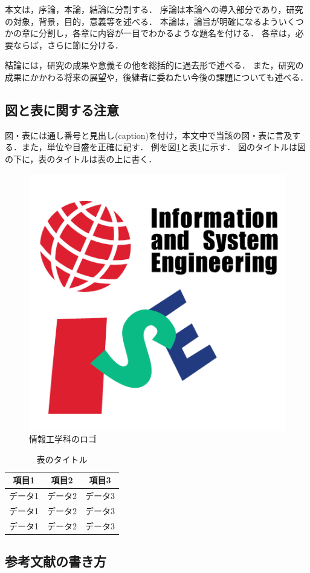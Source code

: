 \documentclass[10pt,a4paper,notitlepage,oneside,twocolumn]{abst_ltjsarticle}
\begin{document}
本文は，序論，本論，結論に分割する．
序論は本論への導入部分であり，研究の対象，背景，目的，意義等を述べる．
本論は，論旨が明確になるよういくつかの章に分割し，各章に内容が一目でわかるような題名を付ける．
各章は，必要ならば，さらに節に分ける．


結論には，研究の成果や意義その他を総括的に過去形で述べる．
また，研究の成果にかかわる将来の展望や，後継者に委ねたい今後の課題についても述べる．

\subsection{図と表に関する注意} \label{subsec:section22}

図・表には通し番号と見出し(caption)を付け，本文中で当該の図・表に言及する．また，単位や目盛を正確に記す．
例を図\ref{fig:logo}と表\ref{tab:}に示す．
図のタイトルは図の下に，表のタイトルは表の上に書く．


\begin{figure}[t]
    \centering
    \includegraphics[width=0.52\linewidth]{logo_color.png}
    \caption{情報工学科のロゴ}
    \label{fig:logo}
  \end{figure}

\begin {table}[t]
    \centering
  \caption{表のタイトル}
  \label{tab:}
  \begin {tabular}{ccc} \hline
     項目1 & 項目2 & 項目3 \\ \hline
    データ1 & データ2 & データ3 \\
    データ1 & データ2 & データ3 \\
    データ1 & データ2 & データ3 \\ \hline
  \end {tabular}
\end {table}

\subsection{参考文献の書き方} \label{subsec:section23}
\end{document}
